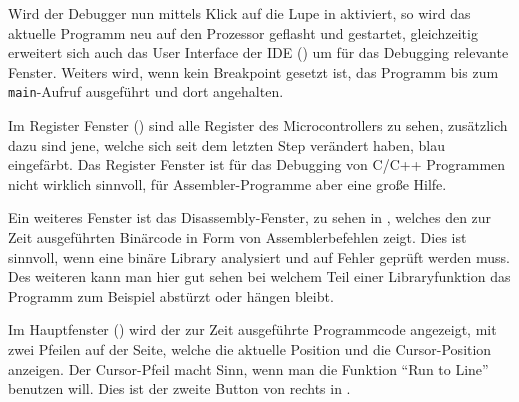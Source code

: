 
Wird der Debugger nun mittels Klick auf die Lupe in  aktiviert, so wird das aktuelle Programm neu auf den Prozessor geflasht und gestartet, gleichzeitig erweitert sich auch das User Interface der \gls{IDE} () um für das \gls{Debugging} relevante Fenster. Weiters wird, wenn kein Breakpoint gesetzt ist, das Programm bis zum \texttt{main}-Aufruf ausgeführt und dort angehalten.


Im Register Fenster () sind alle Register des Microcontrollers zu sehen, zusätzlich dazu sind jene, welche sich seit dem letzten Step verändert haben, blau eingefärbt. Das Register Fenster ist für das \gls{Debugging} von \gls{C}/\gls{C++} Programmen nicht wirklich sinnvoll, für Assembler-Programme aber eine große Hilfe.


Ein weiteres Fenster ist das Disassembly-Fenster, zu sehen in , welches den zur Zeit ausgeführten Binärcode in Form von Assemblerbefehlen zeigt. Dies ist sinnvoll, wenn eine binäre Library analysiert und auf Fehler geprüft werden muss. Des weiteren kann man hier gut sehen bei welchem Teil einer Libraryfunktion das Programm zum Beispiel abstürzt oder hängen bleibt.


Im Hauptfenster () wird der zur Zeit ausgeführte Programmcode angezeigt, mit zwei Pfeilen auf der Seite, welche die aktuelle Position und die Cursor-Position anzeigen. Der Cursor-Pfeil macht Sinn, wenn man die Funktion \enquote{Run to Line} benutzen will. Dies ist der zweite Button von rechts in .



